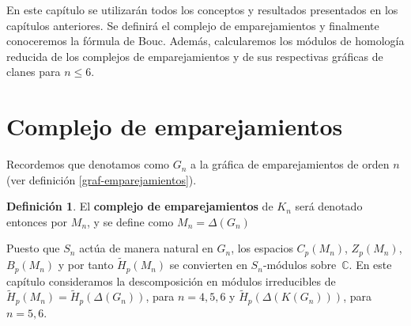 \documentclass[12pt]{book}
\theoremstyle{definition}
\newtheorem{definition}[theorem]{Definición}
\newcounter{in}
\newcounter{ini}
\begin{document}
En este capítulo se utilizarán todos los conceptos y resultados
presentados en los capítulos anteriores. Se definirá el complejo de
emparejamientos y finalmente conoceremos la
fórmula de Bouc. Además, calcularemos los módulos de homología reducida de los
complejos de emparejamientos y de sus respectivas gráficas de clanes para
$n\leq 6$.

\section{Complejo de emparejamientos}
\label{complejo-emparejamientos}

Recordemos que denotamos como $G_{n}$ a la gráfica de
emparejamientos de orden $n$ (ver definición \ref{graf-emparejamientos}).

\begin{definition}
El \textbf{complejo de emparejamientos} de $K_{n}$ será denotado
entonces por $M_{n}$, y se define como $M_{n}=\Delta(G_{n})$
\end{definition}

Puesto que $S_{n}$ actúa de manera
natural en $G_{n}$, los espacios $C_{p}(M_{n})$, $Z_{p}(M_{n})$,
$B_{p}(M_{n})$ y por tanto $\widetilde H_{p}(M_{n})$ se convierten en
$S_{n}$-módulos sobre~$\mathbb{C}$. En este capítulo consideramos
la descomposición en módulos irreducibles de
$\widetilde H_{p}(M_{n})=\widetilde H_{p}(\Delta(G_{n}))$, para
$n=4,5,6$ y $\widetilde H_{p}(\Delta(K(G_{n})))$, para $n=5,6$.
\end{document}
